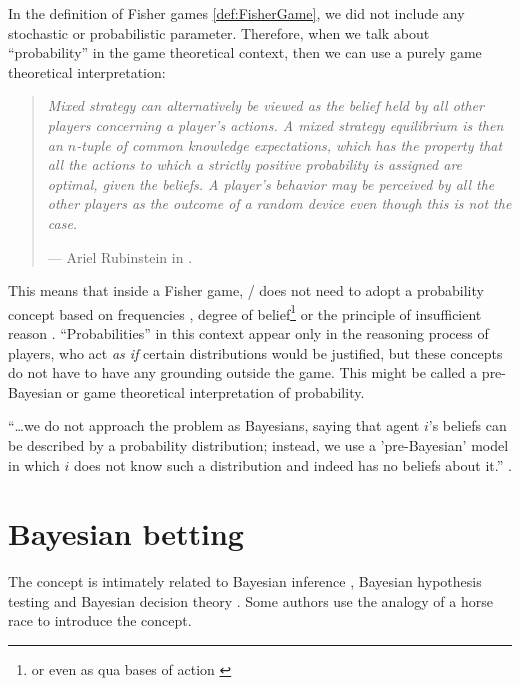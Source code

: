 \documentclass{article}
\theoremstyle{definition}
\begin{document}
In the definition of Fisher games \ref{def:FisherGame}, we did not include any stochastic or probabilistic parameter. 
Therefore, when we talk about ``probability'' in the game theoretical context, then we can use a purely game theoretical interpretation:

\begin{quote}
    {\it
    Mixed strategy can alternatively be viewed as the belief held by all other players concerning a player's actions. A mixed strategy equilibrium is then an $n$-tuple of common knowledge expectations, which has the property that all the actions to which a strictly positive probability is assigned are optimal, given the beliefs. A player's behavior may be perceived by all the other players as the outcome of a random device even though this is not the case.
    }
    
    \hfill --- Ariel Rubinstein in \cite{paper:Rubinstein}.
    \end{quote}

This means that inside a Fisher game, \PI/ does not need to adopt a probability concept based on frequencies \cite{book:VonMises}, degree of belief\footnote{or even as qua bases of action \cite{essay:Ramsey}} \cite{book:Jaynes} or the principle of insufficient reason \cite{book:Laplace}.
``Probabilities'' in this context appear only in the reasoning process of players, who act \emph{as if} certain distributions would be justified, but these concepts do not have to have any grounding outside the game.
This might be called a pre-Bayesian or game theoretical interpretation of probability.

``\dots we do not approach the problem as Bayesians, saying that agent $i$’s
beliefs can be described by a probability distribution; instead, we use a 'pre-Bayesian' model in which $i$ does not know such a distribution and indeed has no beliefs about it.'' \cite{book:EssentialGameTheory}.



\section{Bayesian betting}

The concept is intimately related to Bayesian inference \cite{book:Jaynes,book:Bernardo}, Bayesian hypothesis testing \cite{book:Jaynes} and Bayesian decision theory \cite{book:BayesianDataAnalysis}. Some authors use the analogy of a horse race \cite{book:InformationTheory} to introduce the concept.
\end{document}
